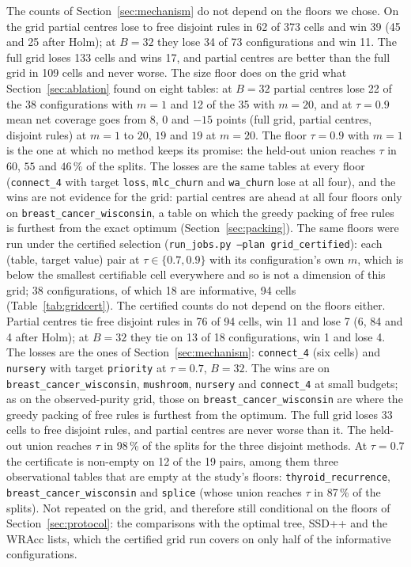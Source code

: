 \documentclass[11pt]{article}
\begin{document}
The counts of Section~\ref{sec:mechanism} do not depend on the floors we chose. On the grid partial centres lose to free disjoint rules in 62 of 373 cells and win 39 (45 and 25 after Holm); at $B=32$ they lose 34 of 73 configurations and win 11. The full grid loses 133 cells and wins 17, and partial centres are better than the full grid in 109 cells and never worse. The size floor does on the grid what Section~\ref{sec:ablation} found on eight tables: at $B=32$ partial centres lose 22 of the 38 configurations with $m=1$ and 12 of the 35 with $m=20$, and at $\tau=0.9$ mean net coverage goes from $8$, $0$ and $-15$ points (full grid, partial centres, disjoint rules) at $m=1$ to $20$, $19$ and $19$ at $m=20$. The floor $\tau=0.9$ with $m=1$ is the one at which no method keeps its promise: the held-out union reaches $\tau$ in $60$, $55$ and $46\,\%$ of the splits. The losses are the same tables at every floor (\texttt{connect\_4} with target \texttt{loss}, \texttt{mlc\_churn} and \texttt{wa\_churn} lose at all four), and the wins are not evidence for the grid: partial centres are ahead at all four floors only on \texttt{breast\_cancer\_wisconsin}, a table on which the greedy packing of free rules is furthest from the exact optimum (Section~\ref{sec:packing}). The same floors were run under the certified selection (\texttt{run\_jobs.py --plan grid\_certified}): each (table, target value) pair at $\tau\in\{0.7,0.9\}$ with its configuration's own $m$, which is below the smallest certifiable cell everywhere and so is not a dimension of this grid; 38 configurations, of which 18 are informative, 94 cells (Table~\ref{tab:gridcert}). The certified counts do not depend on the floors either. Partial centres tie free disjoint rules in 76 of 94 cells, win 11 and lose 7 (6, 84 and 4 after Holm); at $B=32$ they tie on 13 of 18 configurations, win 1 and lose 4. The losses are the ones of Section~\ref{sec:mechanism}: \texttt{connect\_4} (six cells) and \texttt{nursery} with target \texttt{priority} at $\tau=0.7$, $B=32$. The wins are on \texttt{breast\_cancer\_wisconsin}, \texttt{mushroom}, \texttt{nursery} and \texttt{connect\_4} at small budgets; as on the observed-purity grid, those on \texttt{breast\_cancer\_wisconsin} are where the greedy packing of free rules is furthest from the optimum. The full grid loses 33 cells to free disjoint rules, and partial centres are never worse than it. The held-out union reaches $\tau$ in 98\,\% of the splits for the three disjoint methods. At $\tau=0.7$ the certificate is non-empty on 12 of the 19 pairs, among them three observational tables that are empty at the study's floors: \texttt{thyroid\_recurrence}, \texttt{breast\_cancer\_wisconsin} and \texttt{splice} (whose union reaches $\tau$ in 87\,\% of the splits). Not repeated on the grid, and therefore still conditional on the floors of Section~\ref{sec:protocol}: the comparisons with the optimal tree, SSD++ and the WRAcc lists, which the certified grid run covers on only half of the informative configurations.
\end{document}
